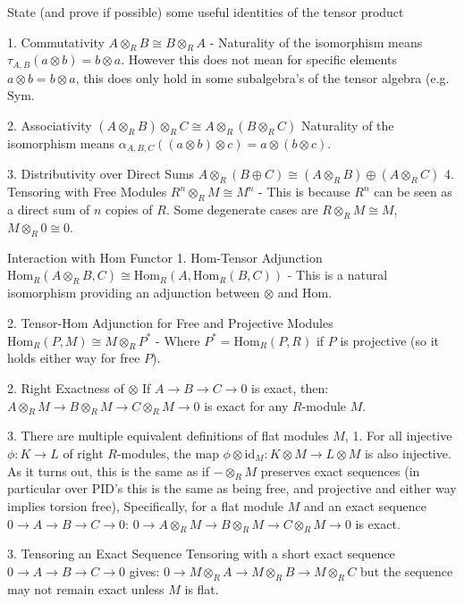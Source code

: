 State (and prove if possible) some useful identities of the tensor product

1. 
Commutativity
\(
A \otimes_R B \cong B \otimes_R A
\)
- Naturality of the isomorphism means \( \tau_{A, B}(a \otimes b) = b \otimes a \).
However this does not mean for specific elements \( a \otimes b = b \otimes a \), this does only
hold in some subalgebra's of the tensor algebra (e.g. \( \text{Sym} \).

2. Associativity
\(
(A \otimes_R B) \otimes_R C \cong A \otimes_R (B \otimes_R C)
\)
 Naturality of the isomorphism means \(\alpha_{A, B, C}((a \otimes b) \otimes c) = a \otimes (b \otimes c)\).
 
3. Distributivity over Direct Sums
\(
A \otimes_R (B \oplus C) \cong (A \otimes_R B) \oplus (A \otimes_R C)
\)
4. Tensoring with Free Modules
\(
R^n \otimes_R M \cong M^n
\)
- This is because \(R^n\) can be seen as a direct sum of \(n\) copies of \(R\).
Some degenerate cases are \( R \otimes_R M \cong M \), \( M \otimes_R 0 \cong 0 \).


Interaction with Hom Functor
1. Hom-Tensor Adjunction
\(
\text{Hom}_R(A \otimes_R B, C) \cong \text{Hom}_R(A, \text{Hom}_R(B, C))
\)
- This is a natural isomorphism providing an adjunction between \(\otimes\) and \(\text{Hom}\).

2. Tensor-Hom Adjunction for Free and Projective Modules
\(
\text{Hom}_R(P, M) \cong M \otimes_R P^*
\)
- Where \(P^* = \text{Hom}_R(P, R)\) if \(P\) is projective (so it holds either way for free \( P \)).

2. Right Exactness of \(\otimes\)
If \(A \rightarrow B \rightarrow C \rightarrow 0\) is exact, then:
\(
A \otimes_R M \rightarrow B \otimes_R M \rightarrow C \otimes_R M \rightarrow 0
\)
is exact for any \(R\)-module \(M\).

3.
There are multiple equivalent definitions of flat modules \( M \),
1. For all injective \( \phi : K \to L \) of right \( R \)-modules, the map \( \phi \otimes \text{id}_{M} : K \otimes M \to L \otimes M \)
is also injective. As it turns out, this is the same as if \(- \otimes_R M\) preserves exact sequences (in particular over PID's this is the same
as being free, and projective and either way implies torsion free),
Specifically, for a flat module \(M\) and an exact sequence \(0 \rightarrow A \rightarrow B \rightarrow C \rightarrow 0\):
 \(
 0 \rightarrow A \otimes_R M \rightarrow B \otimes_R M \rightarrow C \otimes_R M \rightarrow 0
 \)
 is exact.

3. Tensoring an Exact Sequence
Tensoring with a short exact sequence \(0 \rightarrow A \rightarrow B \rightarrow C \rightarrow 0\) gives:
 \(
 0 \rightarrow M \otimes_R A \rightarrow M \otimes_R B \rightarrow M \otimes_R C
 \)
 but the sequence may not remain exact unless \(M\) is flat.

